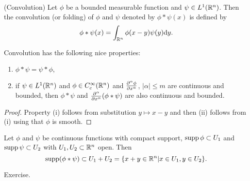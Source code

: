 \documentclass[11pt]{article}
\begin{document}
			\begin{defi}(Convolution)
				Let $\phi$ be a bounded measurable function and $\psi\in L^1(\R^n)$. Then the convolution (or folding) of $\phi$ and $\psi$ denoted by $\phi\ast\psi(x)$ is defined by
				\begin{equation*}
					\phi\ast\psi(x)=\int_{\R^n}\phi(x-y)\psi(y)\mathrm{d}y.
				\end{equation*}
			\end{defi}

			\begin{prop}\label{prop--convolution}
				Convolution has the following nice properties:
				\begin{enumerate}
					\item $\phi\ast\psi=\psi\ast\phi$,
					\item if $\psi\in L^1(\R^n)$ and $\phi\in C^\infty_c(\R^n)$ and $\del[\alpha]{\phi}{x^\alpha}$, $|\alpha|\le m$ are continuous and bounded, then $\phi\ast\psi$ and $\del[\alpha]{}{x^\alpha}(\phi\ast\psi)$ are also continuous and bounded.
				\end{enumerate}
			\end{prop}
			\begin{proof}
				Property (i) follows from substitution $y\mapsto x-y$ and then (ii) follows from (i) using that $\phi$ is smooth.
			\end{proof}

			\begin{prop}
				Let $\phi$ and $\psi$ be continuous functions with compact support, $\supp\phi\subset U_1$ and $\supp\psi\subset U_2$ with $U_{1},U_2\subset\R^n$ open. Then
				\begin{equation*}
					\supp(\phi\ast\psi)\subset U_1+U_2=\{x+y\in\R^n|x\in U_1, y\in U_2\}.
				\end{equation*}
			\end{prop}
			\begin{pproof}
				Exercise.
			\end{pproof}
			
\end{document}
